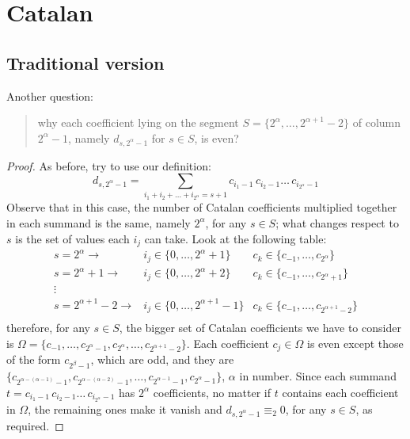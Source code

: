 \documentclass[11pt,a4paper]{article} %
\begin{document}
    \section{Catalan}

    \subsection{Traditional version}


    Another question: 
    \begin{quote}
        why each coefficient lying on the segment 
        $S=\lbrace2^{\alpha},\ldots,2^{\alpha+1}-2\rbrace$ of column 
        $2^{\alpha}-1$, namely $d_{s,2^{\alpha}-1}$ for $s\in S$, is even?
    \end{quote}
    \begin{proof}
    As before, try to use our definition:
    \begin{displaymath}
        d_{s, 2^{\alpha}-1} = \sum_{i_{1}+i_{2}+\ldots+i_{2^{\alpha}}=s+1}
            {c_{i_{1}-1}\,c_{i_{2}-1}\ldots\,c_{i_{2^{\alpha}}-1}}
    \end{displaymath}
    Observe that in this case, the number of Catalan coefficients
    multiplied together in each summand is the same, namely $2^{\alpha}$,
    for any $s\in S$; what changes respect to $s$ is the set of values 
    each $i_{j}$ can take. Look at the following table:
    \begin{displaymath}
        \begin{array}{rcc}
            s = 2^{\alpha} \rightarrow
                & i_{j}\in\lbrace0,\ldots,2^{\alpha}+1\rbrace 
                & c_{k}\in\lbrace c_{-1},\ldots,c_{2^{\alpha}}\rbrace\\
            s = 2^{\alpha} +1\rightarrow
                & i_{j}\in\lbrace0,\ldots,2^{\alpha}+2\rbrace 
                & c_{k}\in\lbrace c_{-1},\ldots,c_{2^{\alpha}+1}\rbrace\\
            \vdots & & \\
            s = 2^{\alpha+1} -2\rightarrow
                & i_{j}\in\lbrace0,\ldots,2^{\alpha+1}-1\rbrace 
                & c_{k}\in\lbrace c_{-1},\ldots,c_{2^{\alpha+1}-2}\rbrace\\
        \end{array}
    \end{displaymath}
    therefore, for any $s\in S$, the bigger set of Catalan coefficients we have 
    to consider is $\Omega = \lbrace c_{-1},\ldots,c_{2^{\alpha}-1},c_{2^{\alpha}},\ldots,c_{2^{\alpha+1}-2}\rbrace$.
    Each coefficient $c_{j}\in\Omega$ is even except those of the form $c_{2^{\beta}-1}$, which are odd,
    and they are $\lbrace c_{2^{\alpha-(\alpha-1)}-1},c_{2^{\alpha-(\alpha-2)}-1},\ldots, 
        c_{2^{\alpha-1}-1},c_{2^{\alpha}-1}\rbrace$, $\alpha$ in number.
    Since each summand $t=c_{i_{1}-1}\,c_{i_{2}-1}\ldots\,c_{i_{2^{\alpha}}-1}$ 
    has $2^{\alpha}$ coefficients, no matter if $t$ contains each coefficient in $\Omega$,
    the remaining ones make it vanish and $ d_{s, 2^{\alpha}-1} \equiv_{2} 0$, for any $s\in S$,
    as required.

    \end{proof}
\end{document}
